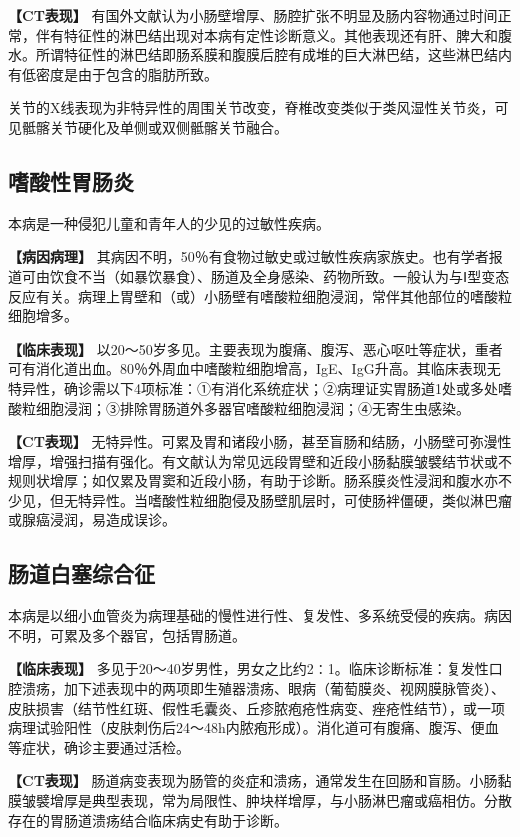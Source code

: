 \textbf{【CT表现】}
有国外文献认为小肠壁增厚、肠腔扩张不明显及肠内容物通过时间正常，伴有特征性的淋巴结出现对本病有定性诊断意义。其他表现还有肝、脾大和腹水。所谓特征性的淋巴结即肠系膜和腹膜后腔有成堆的巨大淋巴结，这些淋巴结内有低密度是由于包含的脂肪所致。

关节的X线表现为非特异性的周围关节改变，脊椎改变类似于类风湿性关节炎，可见骶髂关节硬化及单侧或双侧骶髂关节融合。

\subsection{嗜酸性胃肠炎}

本病是一种侵犯儿童和青年人的少见的过敏性疾病。

\textbf{【病因病理】}
其病因不明，50％有食物过敏史或过敏性疾病家族史。也有学者报道可由饮食不当（如暴饮暴食）、肠道及全身感染、药物所致。一般认为与Ⅰ型变态反应有关。病理上胃壁和（或）小肠壁有嗜酸粒细胞浸润，常伴其他部位的嗜酸粒细胞增多。

\textbf{【临床表现】}
以20～50岁多见。主要表现为腹痛、腹泻、恶心呕吐等症状，重者可有消化道出血。80％外周血中嗜酸粒细胞增高，IgE、IgG升高。其临床表现无特异性，确诊需以下4项标准：①有消化系统症状；②病理证实胃肠道1处或多处嗜酸粒细胞浸润；③排除胃肠道外多器官嗜酸粒细胞浸润；④无寄生虫感染。

\textbf{【CT表现】}
无特异性。可累及胃和诸段小肠，甚至盲肠和结肠，小肠壁可弥漫性增厚，增强扫描有强化。有文献认为常见远段胃壁和近段小肠黏膜皱襞结节状或不规则状增厚；如仅累及胃窦和近段小肠，有助于诊断。肠系膜炎性浸润和腹水亦不少见，但无特异性。当嗜酸性粒细胞侵及肠壁肌层时，可使肠袢僵硬，类似淋巴瘤或腺癌浸润，易造成误诊。

\subsection{肠道白塞综合征}

本病是以细小血管炎为病理基础的慢性进行性、复发性、多系统受侵的疾病。病因不明，可累及多个器官，包括胃肠道。

\textbf{【临床表现】}
多见于20～40岁男性，男女之比约2∶1。临床诊断标准：复发性口腔溃疡，加下述表现中的两项即生殖器溃疡、眼病（葡萄膜炎、视网膜脉管炎）、皮肤损害（结节性红斑、假性毛囊炎、丘疹脓疱疮性病变、痤疮性结节），或一项病理试验阳性（皮肤刺伤后24～48h内脓疱形成）。消化道可有腹痛、腹泻、便血等症状，确诊主要通过活检。

\textbf{【CT表现】}
肠道病变表现为肠管的炎症和溃疡，通常发生在回肠和盲肠。小肠黏膜皱襞增厚是典型表现，常为局限性、肿块样增厚，与小肠淋巴瘤或癌相仿。分散存在的胃肠道溃疡结合临床病史有助于诊断。

